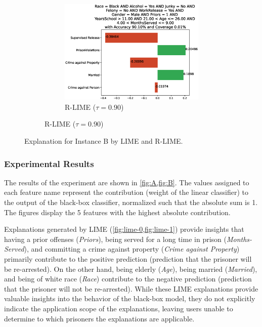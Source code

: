 \documentclass[runningheads]{llncs}
\begin{document}
{\begin{figure}[t]
\begin{subfigure}[t]{0.45\textwidth}
\begin{subfigure}[t]{\textwidth}
          \includegraphics[scale=\scale]{src/experiments/exp1/rlime-0011-90}  %
          \caption{R-LIME ($\tau=0.90$)}\label{fig:rlime-1-90}
        \end{subfigure}
      \end{subfigure}
      \caption[Explanation for Instance B by LIME and R-LIME]{%
        Explanation for Instance B by LIME and R-LIME\@.
      }\label{fig:B}
    \end{figure}
  }

\subsubsection{Experimental Results}
The results of the experiment are shown in \cref{fig:A,fig:B}.
The values assigned to each feature name represent the contribution
(weight of the linear classifier)
to the output of the black-box classifier,
normalized such that the absolute sum is 1.
The figures display the 5 features with the highest absolute contribution.

Explanations generated by LIME (\cref{fig:lime-0,fig:lime-1}) provide insights
that having a prior offenses (\emph{Priors}),
being served for a long time in prison (\emph{Months-Served}),
and committing a crime against property (\emph{Crime against Property})
primarily contribute to the positive prediction
(prediction that the prisoner will be re-arrested).
On the other hand,
being elderly (\emph{Age}), being married (\emph{Married}),
and being of white race (\emph{Race}) contribute to the negative prediction
(prediction that the prisoner will not be re-arrested).
While these LIME explanations provide valuable insights into the behavior of
the black-box model,
they do not explicitly indicate the application scope of the explanations,
leaving users unable to determine to which prisoners the explanations are applicable.
\end{document}
